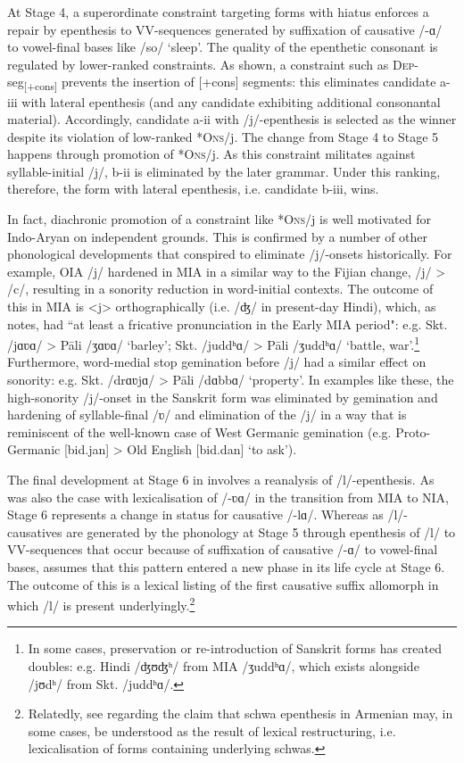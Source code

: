 \documentclass[output=paper,colorlinks,citecolor=brown]{langscibook}
\begin{document}
At Stage 4, a superordinate constraint targeting forms with hiatus enforces a repair by epenthesis to VV-sequences generated by suffixation of causative \mbox{/-ɑ/} to vowel-final bases like /so/ `sleep'.  The quality of the epenthetic consonant is regulated by lower-ranked constraints.  As shown, a constraint such as \textsc{Dep}-seg\textsubscript{[+cons]} prevents the insertion of [+cons] segments: this eliminates candidate a-iii with lateral epenthesis (and any candidate exhibiting additional consonantal material).  Accordingly, candidate a-ii with /j/-epenthesis is selected as the winner despite its violation of low-ranked *O\textsc{ns}/j.  The change from Stage 4 to Stage 5 happens through promotion of *O\textsc{ns}/j.  As this constraint militates against syllable-initial /j/, b-ii is eliminated by the later grammar.  Under this ranking, therefore, the form with lateral epenthesis, i.e. candidate b-iii, wins.

In fact, diachronic promotion of a constraint like *O\textsc{ns}/j is well motivated for Indo-Aryan on independent grounds.  This is confirmed by a number of other phonological developments that conspired to eliminate /j/-onsets historically.  For example, OIA /j/ hardened in MIA in a similar way to the Fijian change, /j/ > /c/, resulting in a sonority reduction in word-initial contexts.  The outcome of this in MIA is <j> orthographically (i.e. /ʤ/ in present-day Hindi), which, as \citet[169]{Masica1991} notes, had ``at least a fricative pronunciation in the Early MIA period": e.g. Skt. /jɑʋɑ/ > Pāli /ʒɑʋɑ/ `barley'; Skt. /juddʰɑ/ > Pāli /ʒuddʰɑ/ `battle, war'.\footnote{In some cases, preservation or re-introduction of Sanskrit forms has created doubles: e.g. Hindi /ʤʊʤʰ/ from MIA /ʒuddʰɑ/, which exists alongside /jʊdʰ/ from Skt. /juddʰɑ/.}  Furthermore, word-medial stop gemination before /j/ had a similar effect on sonority: e.g. Skt. /drɑʋjɑ/ > Pāli /dɑbbɑ/ `property'.  In examples like these, the high-sonority /j/-onset in the Sanskrit form was eliminated by gemination and hardening of syllable-final /ʋ/ and elimination of the /j/ in a way that is reminiscent of the well-known case of West Germanic gemination (e.g. Proto-Germanic [bid.jan] > Old English [bid.dan] `to ask').

The final development at Stage 6 in  involves a reanalysis of /l/\hyp epenthesis.  As was also the case with lexicalisation of /-ʋɑ/ in the transition from MIA to NIA, Stage 6 represents a change in status for causative /-lɑ/.  Whereas as /l/-causatives are generated by the phonology at Stage 5 through epenthesis of /l/ to VV-sequences that occur because of suffixation of causative /-ɑ/ to vowel-final bases,  assumes that this pattern entered a new phase in its life cycle at Stage 6. The outcome of this is a lexical listing of the first causative suffix allomorph in which /l/ is present underlyingly.\footnote{Relatedly, see  regarding the claim that schwa epenthesis in Armenian may, in some cases, be understood as the result of lexical restructuring, i.e. lexicalisation of forms containing underlying schwas.}
\end{document}

